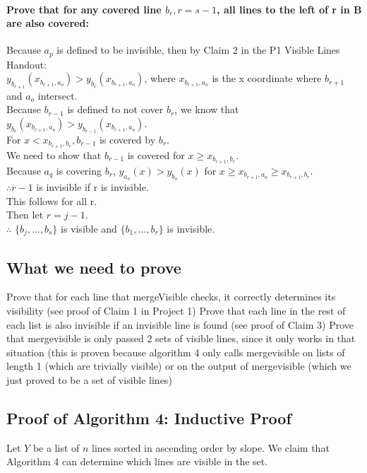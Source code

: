 \documentclass{article}
\begin{document}
    \paragraph{Prove that for any covered line  $b_{r}, r = s - 1$, all lines to the left of r in B are also covered:}
        Because $a_p$ is defined to be invisible, then by Claim 2 in the P1 Visible Lines Handout:\\
        $y_{b_{r+1}}(x_{b_{r+1}, a_{o}}) > y_{b_{r}}(x_{b_{r+1},a_{o}})$, where $x_{b_{r+1}, a_{o}}$ is the x coordinate where $b_{r+1}$ and $a_o$ intersect.\\
        Because $b_{r-1}$ is defined to not cover $b_r$, we know that $y_{b_{r}}(x_{b_{r+1}, a_{o}}) > y_{b_{r-1}}(x_{b_{r+1},a_{o}})$.\\
        For $x < x_{b_{r+1},b_{r}}, b_{r-1}$ is covered by $b_r$.\\
        We need to show that $b_{r-1}$ is covered for $x \geq x_{b_{r+1},b_{r}}$.\\
        Because $a_q$ is covering $b_r$, $y_{a_{o}}(x) > y_{b_{o}}(x)$ for $x \geq x_{b_{r+1},a_{o}} \geq x_{b_{r+1},b_{r}}$.\\
        $\therefore r-1$ is invisible if r is invisible.\\
        This follows for all r.\\
        Then let $r = j - 1$.\\
        $\therefore$ $\{b_j,...,b_s\}$ is visible and $\{b_1,...,b_{r}\}$ is invisible.\\


\subsection*{What we need to prove}
    Prove that for each line that mergeVisible checks, it correctly determines its visibility (see proof of Claim 1 in Project 1)
    Prove that each line in the rest of each list is also invisible if an invisible line is found (see proof of Claim 3)
    Prove that mergevisible is only passed 2 sets of visible lines, since it only works in that situation (this is proven because algorithm 4 only calls mergevisible on lists of length 1 (which are trivially visible) or on the output of mergevisible (which we just proved to be a set of visible lines)

\subsection*{Proof of Algorithm 4: Inductive Proof}
    Let $Y$ be a list of $n$ lines sorted in ascending order by slope. We claim that Algorithm 4 can determine which lines are visible in the set.
\end{document}
